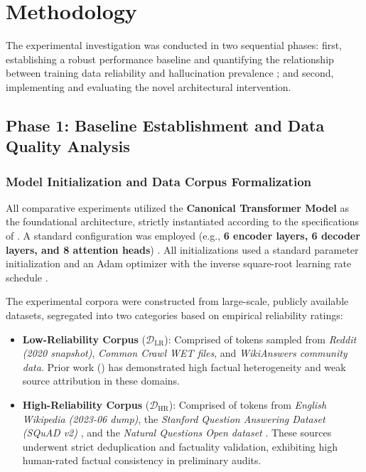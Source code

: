 \section{Methodology}
\label{sec:methodology}

The experimental investigation was conducted in two sequential phases: first, establishing a robust performance baseline and quantifying the relationship between training data reliability and hallucination prevalence \cite{islam2024comprehensive, cossio2025comprehensive, cao2021hallucination}; and second, implementing and evaluating the novel architectural intervention.

\subsection{Phase 1: Baseline Establishment and Data Quality Analysis}
\label{sec:phase1}

\subsubsection{Model Initialization and Data Corpus Formalization}
\label{sec:model_data_formalization}
All comparative experiments utilized the \textbf{Canonical Transformer Model} as the foundational architecture, strictly instantiated according to the specifications of \cite{vaswani2017attention}. A standard configuration was employed (e.g., \textbf{6 encoder layers, 6 decoder layers, and 8 attention heads}) \cite{vaswani2017attention}. All initializations used a standard parameter initialization and an Adam optimizer with the inverse square-root learning rate schedule \cite{vaswani2017attention}.

The experimental corpora were constructed from large-scale, publicly available datasets, segregated into two categories based on empirical reliability ratings:

\begin{itemize}
    \item \textbf{Low-Reliability Corpus} ($\mathcal{D}_{\text{LR}}$): Comprised of tokens sampled from \textit{Reddit (2020 snapshot)}, \textit{Common Crawl WET files}, and \textit{WikiAnswers community data}. Prior work (\cite{cao2021hallucination, islam2024comprehensive, cossio2025comprehensive}) has demonstrated high factual heterogeneity and weak source attribution in these domains.
    \item \textbf{High-Reliability Corpus} ($\mathcal{D}_{\text{HR}}$): Comprised of tokens from \textit{English Wikipedia (2023-06 dump)}, the \textit{Stanford Question Answering Dataset (SQuAD v2)} \cite{rajpurkar2018squadv2}, and the \textit{Natural Questions Open dataset} \cite{kwiatkowski2019natural}. These sources underwent strict deduplication and factuality validation, exhibiting high human-rated factual consistency in preliminary audits.
\end{itemize}

